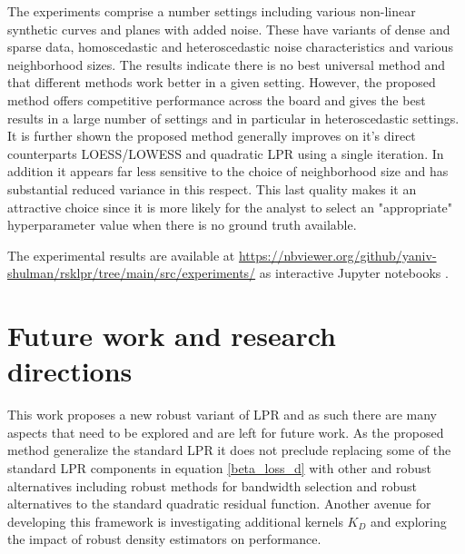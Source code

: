 \documentclass[preprint,1p,times]{elsarticle}
\begin{document}
The experiments comprise a number settings including various non-linear synthetic curves and planes with added noise. These have variants of dense and sparse data, homoscedastic and heteroscedastic noise characteristics and various neighborhood sizes. The results indicate there is no best universal method and that different methods work better in a given setting. However, the proposed method offers competitive performance across the board and gives the best results in a large number of settings and in particular in heteroscedastic settings. It is further shown the proposed method generally improves on it's direct counterparts LOESS/LOWESS and quadratic LPR using a single iteration. In addition it appears far less sensitive to the choice of neighborhood size and has substantial reduced variance in this respect. This last quality makes it an attractive choice since it is more likely for the analyst to select an "appropriate" hyperparameter value when there is no ground truth available.

The experimental results are available at \url{https://nbviewer.org/github/yaniv-shulman/rsklpr/tree/main/src/experiments/} as interactive Jupyter notebooks \cite{jupyter}. 

\section{Future work and research directions}
\label{S:Future work and research directions}
This work proposes a new robust variant of LPR and as such there are many aspects that need to be explored and are left for future work. As the proposed method generalize the standard LPR it does not preclude replacing some of the standard LPR components in equation \eqref{beta_loss_d} with other and robust alternatives including robust methods for bandwidth selection and robust alternatives to the standard quadratic residual function. Another avenue for developing this framework is investigating additional kernels $K_D$ and exploring the impact of robust density estimators on performance.




\end{document}
